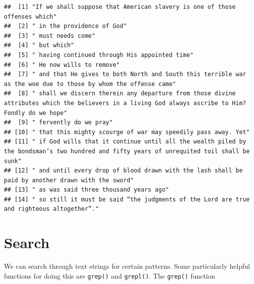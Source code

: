 \documentclass[
]{book}
\begin{document}
\begin{verbatim}
##  [1] "If we shall suppose that American slavery is one of those offenses which"                                                                         
##  [2] " in the providence of God"                                                                                                                        
##  [3] " must needs come"                                                                                                                                 
##  [4] " but which"                                                                                                                                       
##  [5] " having continued through His appointed time"                                                                                                     
##  [6] " He now wills to remove"                                                                                                                          
##  [7] " and that He gives to both North and South this terrible war as the woe due to those by whom the offense came"                                    
##  [8] " shall we discern therein any departure from those divine attributes which the believers in a living God always ascribe to Him? Fondly do we hope"
##  [9] " fervently do we pray"                                                                                                                            
## [10] " that this mighty scourge of war may speedily pass away. Yet"                                                                                     
## [11] " if God wills that it continue until all the wealth piled by the bondsman’s two hundred and fifty years of unrequited toil shall be sunk"         
## [12] " and until every drop of blood drawn with the lash shall be paid by another drawn with the sword"                                                 
## [13] " as was said three thousand years ago"                                                                                                            
## [14] " so still it must be said “the judgments of the Lord are true and righteous altogether”."
\end{verbatim}

\hypertarget{search}{%
\section{Search}\label{search}}

We can search through text strings for certain patterns. Some particularly helpful functions for doing this are \texttt{grep()} and \texttt{grepl()}. The \texttt{grep()} function
\end{document}
